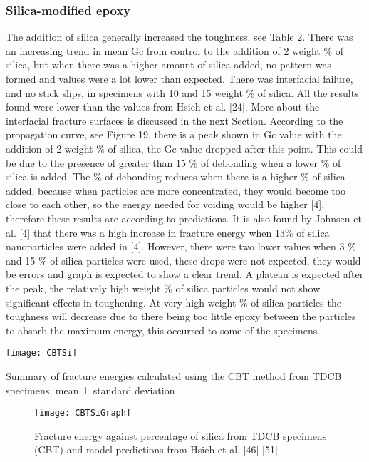 \documentclass[numbers=noendperiod,chapterprefix=on]{icldt} %
\begin{document}
\subsubsection{Silica-modified epoxy}
The addition of silica generally increased the toughness, see Table 2. There was an increasing trend in mean Gc from control to the addition of 2 weight \% of silica, but when there was a higher amount of silica added, no pattern was formed and values were a lot lower than expected. There was interfacial failure, and no stick slips, in specimens with 10 and 15 weight \% of silica. All the results found were lower than the values from Hsieh et al. [24]. More about the interfacial fracture surfaces is discussed in the next Section. 
According to the propagation curve, see Figure 19, there is a peak shown in Gc value with the addition of 2 weight \% of silica, the Gc value dropped after this point. This could be due to the presence of greater than 15 \% of debonding when a lower \% of silica is added. The \% of debonding reduces when there is a higher \% of silica added, because when particles are more concentrated, they would become too close to each other, so the energy needed for voiding would be higher [4], therefore these results are according to predictions. It is also found by Johnsen et al. [4] that there was a high increase in fracture energy when 13\% of silica nanoparticles were added in [4]. However, there were two lower values when 3 \% and 15 \% of silica particles were used, these drops were not expected, they would be errors and graph is expected to show a clear trend. A plateau is expected after the peak, the relatively high weight \% of silica particles would not show significant effects in toughening. At very high weight \% of silica particles the toughness will decrease due to there being too little epoxy between the particles to absorb the maximum energy, this occurred to some of the specimens. 

\begin{table}[!htpb]
\centering
\texttt{[image: CBTSi]}
\caption{Summary of fracture energies calculated using the CBT method from TDCB specimens, mean ± standard deviation} %
\end{table}

\begin{figure}[!htpb]
\centering
\texttt{[image: CBTSiGraph]}
\caption{Fracture energy against percentage of silica from TDCB specimens (CBT) and model predictions from Hsieh et al. [46] [51] } %
\end{figure}
\end{document}
